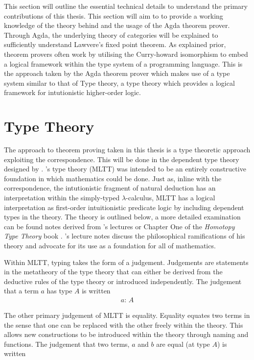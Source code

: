 This section will outline the essential technical details to understand the
primary contributions of this thesis. This section will aim to to provide a
working knowledge of the theory behind and the usage of the Agda theorem prover.
Through Agda, the underlying theory of categories will be explained to
sufficiently understand Lawvere's fixed point theorem. As explained prior,
theorem provers often work by utilising the Curry-howard isomorphism to embed a
logical framework within the type system of a programming language. This is the
approach taken by the Agda theorem prover which makes use of a type system
similar to that of \mlt{} Type theory, a type theory which provides a
logical framework for intutionistic higher-order logic.

\section{\mlt{} Type Theory}
The approach to theorem proving taken in this thesis is a type theoretic
approach exploiting the \cuho{} correspondence. This will be done in the
dependent type theory designed by \mlt{}. \mlt{}'s type theory (MLTT) was intended to be an
entirely constructive foundation in which mathematics could be done. Just as,
inline with the \cuho{} correspondence, the intutionistic fragment of
natural deduction has an interpretation within the simply-typed
$\lambda$-calculus, MLTT has a logical interpretation as first-order
intuitionistic predicate logic by including dependent types in the theory. The
theory is outlined below, a more detailed examination can be found notes derived
from \mlt's lectures \cite{martin1984intuitionistic} or Chapter One of the
\textit{Homotopy Type Theory} book \cite{hottbook}. \mlt's lecture notes
discuss the philosophical ramifications of his theory and advocate for its use
as a foundation for all of mathematics.

Within MLTT, typing takes the form of a judgement. Judgements are statements in
the metatheory of the type theory that can either be derived from the deductive
rules of the type theory or introduced independently. The judgement that a term
$a$ has type $A$ is written
\begin{align*}
    a: \, A
\end{align*}

The other primary judgement of MLTT is equality. Equality equates
two terms in the sense that one can be replaced with the other freely within the
theory. This allows new constructions to be introduced within the theory through
naming and functions. The judgement that
two terms, $a$ and $b$ are equal (at type $A$) is written

